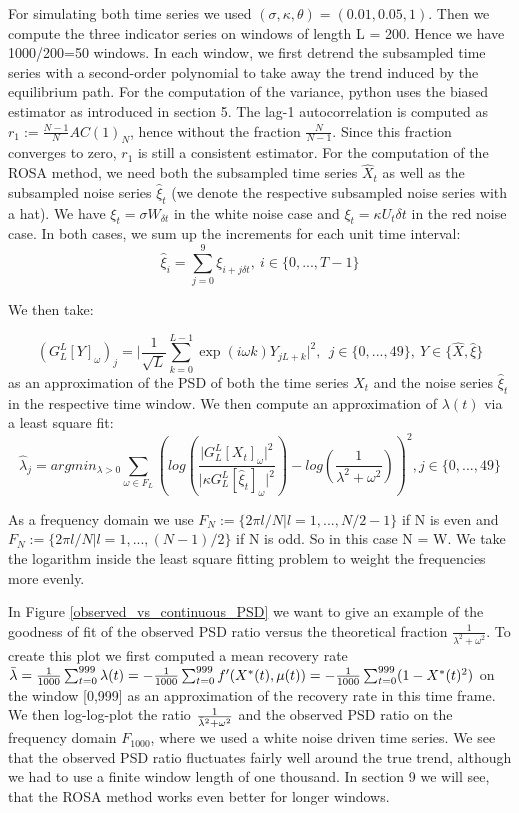 \documentclass[%
thesis=student,%
coverpage=false,%
titlepage=false,%
headmarks=true, %
english,%
font=libertine, %
math=newpxtx, %
BCOR=5mm,%
coverBCOR=11mm%
]{tumbook}
\begin{document}
For simulating both time series we used $(\sigma,\kappa,\theta) = (0.01,0.05,1)$. 
Then we compute the three indicator series on windows of length L = 200. Hence we have 1000/200=50 windows. In each window, we first detrend the subsampled time series with a second-order polynomial to take away the trend induced by the equilibrium path. For the computation of the variance, python uses the biased estimator as introduced in section 5. The lag-1 autocorrelation is computed as $r_{1} := \frac{N-1}{N}AC(1)_{N}$, hence without the fraction $\frac{N}{N-1}$. Since this fraction converges to zero, $r_{1}$ is still a consistent estimator. For the computation of the ROSA method, we need both the subsampled time series $\widehat{X}_{t}$ as well as the subsampled noise series $\widehat{\xi}_{t}$ (we denote the respective subsampled noise series with a hat). We have $\xi_{t} = \sigma W_{\delta t}$ in the white noise case and $\xi_{t} = \kappa U_{t} \delta t$ in the red noise case. In both cases, we sum up the increments for each unit time interval:
\[
\widehat{\xi}_{i} = \sum_{j = 0}^{9}\xi_{i+j\delta t}, \ i \in \{0,...,T-1\}
\]

We then take:

\[
(G_{L}^{L}[Y]_{\omega})_{j} = \lvert \frac{1}{\sqrt{L}}\sum_{k=0}^{L-1}\exp(i\omega k)Y_{jL + k} \rvert ^2, \ \ j \in \{0,...,49\}, \ Y \in \{\widehat{X}, \widehat{\xi}\}
\]
as an approximation of the PSD of both the time series $X_{t}$ and the noise series $\widehat{\xi}_{t}$ in the respective time window. We then compute an approximation of $\lambda(t)$ via a least square fit:
\[
\widehat{\lambda}_{j} = argmin_{\lambda > 0} \sum_{\omega \in F_{L}} (log(\frac{\lvert G_{L}^{L}[X_{t}]_{\omega}\rvert^2}{\lvert \kappa G_{L}^{L}[\widehat{\xi}_{t}]_{\omega} \rvert^2}) - log(\frac{1}{\lambda^2 + \omega^2}))^2, j \in \{0,...,49\}
\]

As a frequency domain we use $F_{N}:=\{2\pi l/N | l = 1,...,N/2 - 1\}$ if N is even and $F_{N} := \{2\pi l/N | l = 1,...,(N-1)/2 \}$ if N is odd. So in this case N = W. We take the logarithm inside the least square fitting problem to weight the frequencies more evenly. 

In Figure \ref{observed_vs_continuous_PSD} we want to give an example of the goodness of fit of the observed PSD ratio versus the theoretical fraction $\frac{1}{\lambda^2 + \omega^2}$. To create this plot we first computed a mean recovery rate $\Bar{\lambda} = \frac{1}{1000}\sum_{t=0}^{999}\lambda(t) = -\frac{1}{1000}\sum_{t=0}^{999}f'(X^{*}(t),\mu(t)) = -\frac{1}{1000}\sum_{t=0}^{999}(1-X^{*}(t)^2)$ on the window [0,999] as an approximation of the recovery rate in this time frame. We then log-log-plot the ratio $\frac{1}{\Bar{\lambda}^2 + \omega^2}$ and the observed PSD ratio on the frequency domain $F_{1000}$, where we used a white noise driven time series. We see that the observed PSD ratio fluctuates fairly well around the true trend, although we had to use a finite window length of one thousand.
In section 9 we will see, that the ROSA method works even better for longer windows.
\end{document}
